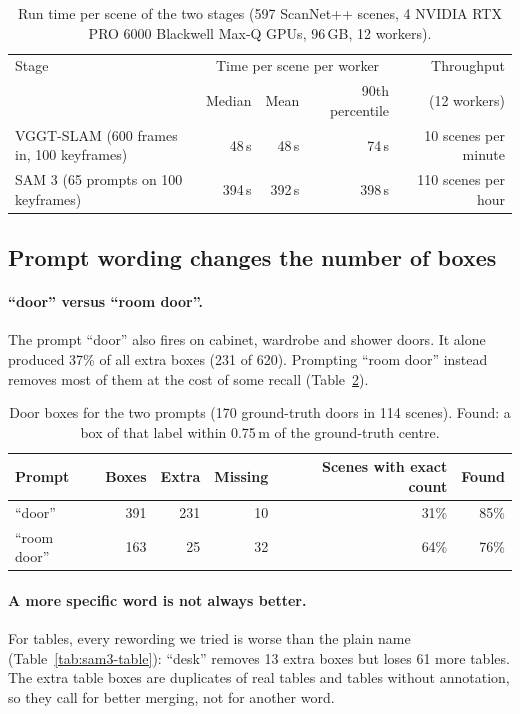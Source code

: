 \begin{table}[t]
\centering
\caption{Run time per scene of the two stages (597 ScanNet++ scenes, 4 NVIDIA RTX PRO 6000 Blackwell Max-Q GPUs,
96\,GB, 12 workers).}
\label{tab:sam3-time}
\begin{tabular}{lrrrr}
\toprule
Stage & \multicolumn{3}{c}{Time per scene per worker} & Throughput \\
      & Median & Mean & 90th percentile & (12 workers) \\
\midrule
VGGT-SLAM (600 frames in, 100 keyframes)   &  48\,s &  48\,s &  74\,s & 10 scenes per minute \\
SAM 3 (65 prompts on 100 keyframes)        & 394\,s & 392\,s & 398\,s & 110 scenes per hour \\
\bottomrule
\end{tabular}
\end{table}

\subsection{Prompt wording changes the number of boxes}

\paragraph{``door'' versus ``room door''.}
The prompt ``door'' also fires on cabinet, wardrobe and shower doors. It alone produced 37\% of all extra boxes
(231 of 620). Prompting ``room door'' instead removes most of them at the cost of some recall
(Table~\ref{tab:sam3-door}).

\begin{table}[t]
\centering
\caption{Door boxes for the two prompts (170 ground-truth doors in 114 scenes).
Found: a box of that label within 0.75\,m of the ground-truth centre.}
\label{tab:sam3-door}
\begin{tabular}{lrrrrr}
\toprule
Prompt & Boxes & Extra & Missing & Scenes with exact count & Found \\
\midrule
``door''      & 391 & 231 & 10 & 31\% & 85\% \\
``room door'' & 163 &  25 & 32 & 64\% & 76\% \\
\bottomrule
\end{tabular}
\end{table}

\paragraph{A more specific word is not always better.}
For tables, every rewording we tried is worse than the plain name (Table~\ref{tab:sam3-table}): ``desk'' removes
13 extra boxes but loses 61 more tables. The extra table boxes are duplicates of real tables and tables without
annotation, so they call for better merging, not for another word.

